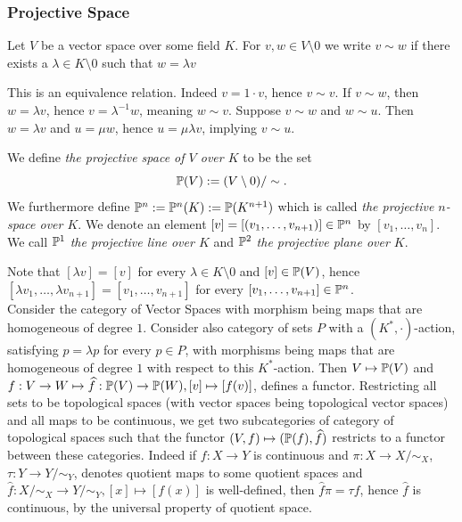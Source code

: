 \subsubsection{Projective Space}
    \begin{definition}\label{ProjectiveEquivalence}
        Let $V$ be a vector space over some field $K$. For $v,w\in V\setminus 0$ we write $v\sim w$ if there exists a $\lambda\in K\setminus 0$ such that $w = \lambda v$
    \end{definition}
    \begin{remark}
        This is an equivalence relation. Indeed $v = 1\cdot v$, hence $v\sim v$. If $v\sim w$, then $w =\lambda v$, hence $v= \lambda^{-1}w$, meaning $w\sim v$. Suppose $v\sim w$ and $w\sim u$. Then $w=\lambda v$ and $u = \mu w$, hence $u = \mu\lambda v$, implying $v\sim u$. 
    \end{remark}
    \begin{definition}
        We define \textit{the projective space of $V$ over $K$} to be the set 
        $$\mathbb{P}(V) := (V\setminus 0)/\sim.$$
        We furthermore define $\mathbb{P}^n:=\mathbb{P}^n(K):= \mathbb{P}(K^{n+1})$ which is called \textit{the projective $n$-space over $K$}. We denote an element $[v]=[(v_1,\dots,v_{n+1})]\in \mathbb{P}^n$ by $[v_1,\dots,v_n]$.   We call $\mathbb{P}^1$ \textit{the projective line over $K$} and $\mathbb{P}^2$ \textit{the projective plane over $K$}.   
    \end{definition}
    \begin{remark}
        Note that $[\lambda v]=[v]$ for every $\lambda\in K\setminus 0$ and $[v]\in \mathbb{P}(V)$, hence $[\lambda v_1,\dots,\lambda v_{n+1}]=[v_1,\dots,v_{n+1}]$ for every $[v_1,\dots,v_{n+1}]\in\mathbb{P}^n$.\\
        Consider the category of Vector Spaces with morphism being maps that are homogeneous of degree $1$. Consider also category of sets $P$ with a $(K^\ast,\cdot)$-action, satisfying $p=\lambda p$ for every $p\in P$, with morphisms being maps that are homogeneous of degree $1$ with respect to this $K^\ast$-action. Then $V\mapsto \mathbb{P}(V)$ and $f: V\rightarrow W\mapsto \widehat{f} : \mathbb{P}(V)\rightarrow \mathbb{P}(W), [v]\mapsto [f(v)]$, defines a functor. Restricting all sets to be topological spaces (with vector spaces being topological vector spaces) and all maps to be continuous, we get two subcategories of category of topological spaces such that the functor $(V,f)\mapsto (\mathbb{P}(f),\widehat{f})$ restricts to a functor between these categories. Indeed if $f: X\rightarrow Y$ is continuous and $\pi: X\rightarrow X/\sim_X$, $\tau: Y\rightarrow Y/\sim_Y$, denotes quotient maps to some quotient spaces and $\widehat{f}: X/\sim_X \rightarrow Y/\sim_Y, [x]\mapsto [f(x)]$ is well-defined, then $\widehat{f}\pi = \tau f $, hence $\widehat{f}$ is continuous, by the universal property of quotient space.    
    \end{remark}
